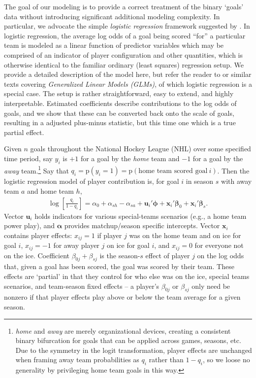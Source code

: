 The goal of our modeling is to provide a correct treatment of the binary
`goals' data without introducing significant additional modeling complexity.
In particular, we advocate the simple \textit{logistic regression} framework
suggested by \cite{gramacy:jensen:taddy:2013}.  In logistic regression, the
average log odds of a goal being scored ``for'' a particular team  is modeled
as a linear function of predictor variables which may be comprised of an
indicator of player configuration and other quantities, which is otherwise
identical to the familiar ordinary (least squares) regression setup.  We
provide a detailed description of the model here, but refer the reader to
\cite{sheather:2009} or similar texts covering {\em Generalized Linear Models
(GLMs)}, of which logistic regression is a special case.
The setup is rather straightforward, easy to
extend, and highly interpretable.  Estimated coefficients describe
contributions to the log odds of goals, and we show that these can be
converted back onto the scale of goals, resulting in a adjusted plus-minus
statistic, but this time one which is a true partial effect.  

Given $n$ goals throughout the National Hockey League (NHL) over some
specified time period,  say $y_i$ is $+1$ for a goal by the \textit{home} team
and $-1$ for a goal by the \textit{away} team.\footnote{{\em home} and {\em away} are merely organizational devices,
creating a consistent binary bifurcation for goals that can be applied across
games, seasons, etc. Due to the symmetry in the logit transformation, player effects are unchanged when framing away team probabilities as $q_i$ rather
than $1-q_i$, so we loose no generality by privileging home team goals in
this way.}  Say that $q_i = \mathrm{p}(y_i
= 1) =  \mathrm{p}(\text{home~team~scored~goal}~i)$.  Then the logistic
regression model of player contribution is, for goal $i$ in season $s$ with
away team $a$ and home team $h$,  \begin{align}\label{hockeymod}
\log\left[\frac{q_{i}}{1-q_{i}}\right] = \alpha_0 + \alpha_{sh} - \alpha_{sa} +
\mathbf{u}_i'\boldsymbol{\phi} + \mathbf{x}_i'\boldsymbol{\beta}_0 +
\mathbf{x}_i'\boldsymbol{\beta}_s. \end{align}  Vector $\mathbf{u}_i$ holds
indicators for various special-teams scenarios (e.g., a home team power play),
and $\boldsymbol{\alpha}$ provides matchup/season specific intercepts. Vector
$\mathbf{x}_i$ contains player effects: $x_{ij}=1$ if player $j$ was on the
home team and on ice for goal $i$, $x_{ij}=-1$ for away player $j$ on ice for
goal $i$, and $x_{ij}=0$ for everyone not on the ice.   Coefficient
$\beta_{0j} + \beta_{sj}$ is the season-$s$ effect of player $j$ on the log
odds that, given a goal has been scored, the goal was scored by their team.
These effects are `partial' in that they control for who else was on the ice,
special teams scenarios, and team-season fixed effects -- a player's
$\beta_{0j}$ or $\beta_{sj}$ only need be nonzero if that player effects play
above or below the team average for a given season.

